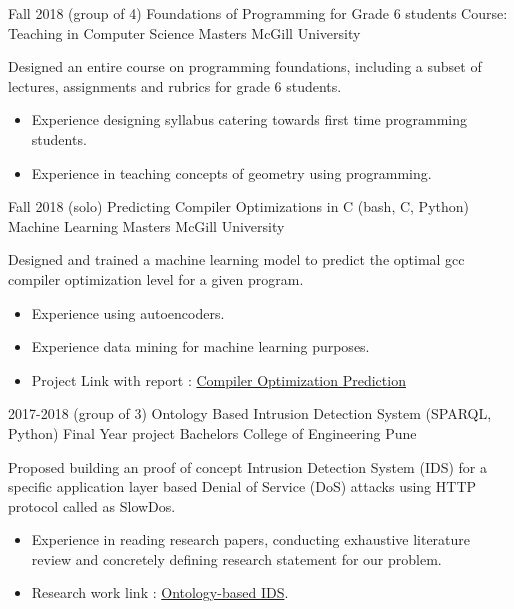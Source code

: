         \cventry
            {Fall 2018 (group of 4)} %
            {Foundations of Programming for Grade 6 students} %
            {Course: Teaching in Computer Science} %
            {Masters} 
            {McGill University} %
            {
                Designed an entire course on programming foundations, including a subset of lectures, assignments and rubrics for grade 6 students. 
                \begin{itemize} %
                    \item Experience designing syllabus catering towards first time programming students. 
                    \item Experience in teaching concepts of geometry using programming.
                \end{itemize}
            }
            {}

        \cventry
            {Fall 2018 (solo)} %
            {Predicting Compiler Optimizations in C (bash, C, Python)} %
            {Machine Learning} %
            {Masters} 
            {McGill University} %
            {
                Designed and trained a machine learning model to predict the optimal gcc compiler optimization level for a given program. %
                \begin{itemize} %
                    \item Experience using autoencoders. 
                    \item Experience data mining for machine learning purposes. 
                    \item Project Link with report : \href{https://github.com/jaag5678/CompOptML.git}{Compiler Optimization Prediction}
                \end{itemize}
            }
            {}

        \cventry
            {2017-2018 (group of 3)} %
            {Ontology Based Intrusion Detection System (SPARQL, Python)} %
            {Final Year project} %
            {Bachelors} 
            {College of Engineering Pune} %
            {
                Proposed building an proof of concept Intrusion Detection System (IDS) for a specific application layer based Denial of Service (DoS) attacks using HTTP protocol called as SlowDos.
                \begin{itemize} %
                    \item Experience in reading research papers, conducting exhaustive literature review and concretely defining research statement for our problem. 
                    \item Research work link : \href{https://github.com/Chromares/IDS_Ontology.git}{Ontology-based IDS}.
                \end{itemize}
            }
            {}

